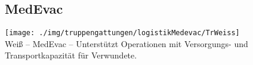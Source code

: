 \subsection{MedEvac}
\texttt{[image: ./img/truppengattungen/logistikMedevac/TrWeiss]}\\
Weiß -- \acf{MedEvac} -- Unterstützt Operationen mit Versorgungs- und Transportkapazität für Verwundete.